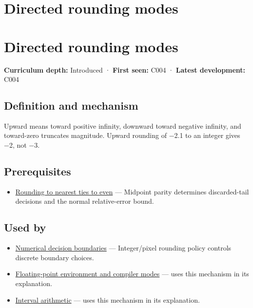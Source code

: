 \hypertarget{appendix-637d164ae5ca}{}
\section*{Directed rounding modes}
\section{Directed rounding modes}\label{directed-rounding-modes}

\textbf{Curriculum depth:} Introduced · \textbf{First seen:} C004 · \textbf{Latest development:} C004

\subsection{Definition and mechanism}\label{definition-and-mechanism}

Upward means toward positive infinity, downward toward negative infinity, and toward-zero truncates magnitude. Upward rounding of −2.1 to an integer gives −2, not −3.

\subsection{Prerequisites}\label{prerequisites}

\begin{itemize}
\tightlist
\item
  \hyperref[appendix-614afe1de592]{Rounding to nearest ties to even} --- Midpoint parity determines discarded-tail decisions and the normal relative-error bound.
\end{itemize}

\subsection{Used by}\label{used-by}

\begin{itemize}
\item
  \hyperref[appendix-c80db39080be]{Numerical decision boundaries} --- Integer/pixel rounding policy controls discrete boundary choices.
\item
  \hyperref[appendix-f11d1a521253]{Floating-point environment and compiler modes} --- uses this mechanism in its explanation.
\item
  \hyperref[appendix-1823a14330cb]{Interval arithmetic} --- uses this mechanism in its explanation.
\end{itemize}


